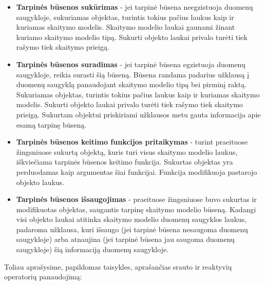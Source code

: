 \begin{itemize}
  \item \textbf{Tarpinės būsenos sukūrimas} - jei tarpinė būsena neegzistuoja duomenų saugykloje, sukuriamas objektas, turintis tokius pačius laukus kaip ir kuriamas skaitymo modelis. Skaitymo modelio laukai gaunami žinant kuriamo skaitymo modelio tipą. Sukurti objekto laukai privalo turėti tiek rašymo tiek skaitymo prieigą.
  \item \textbf{Tarpinės būsenos suradimas} - jei tarpinė būsena egzistuoja duomenų saugykloje, reikia surasti šią būseną. Būsena randama padarius užklausą į duomenų saugyklą panaudojant skaitymo modelio tipą bei pirminį raktą. Sukuriamas objektas, turintis tokius pačius laukus kaip ir kuriamas skaitymo modelis. Sukurti objekto laukai privalo turėti tiek rašymo tiek skaitymo prieigą. Sukurtam objektui priskiriami užklausos metu gauta informacija apie esamą tarpinę būseną.
  \item \textbf{Tarpinės būsenos keitimo funkcijos pritaikymas} - turint praeituose žingsniuose sukurtą objektą, kuris turi visus skaitymo modelio laukus, iškviečiama tarpinės būsenos keitimo funkcija. Sukurtas objektas yra perduodamas kaip argumentas šiai funkcijai. Funkcija modifikuoja pastarojo objekto laukus.
  \item \textbf{Tarpinės būsenos išsaugojimas} - praeituose žingsniuose buvo sukurtas ir modifikuotas objektas, saugantis tarpinę skaitymo modelio būseną. Kadangi visi objekto laukai atitinka skaitymo modelio duomenų saugyklos laukus, padaroma užklausa, kuri išsaugo (jei tarpinė būsena nesaugoma duomenų saugykloje) arba atnaujina (jei tarpinė būsena jau saugoma duomenų saugykloje) šią informaciją duomenų saugykloje.
\end{itemize}

Toliau aprašysime, papildomas taisykles, aprašančias srauto ir reaktyvių operatorių panaudojimą:

